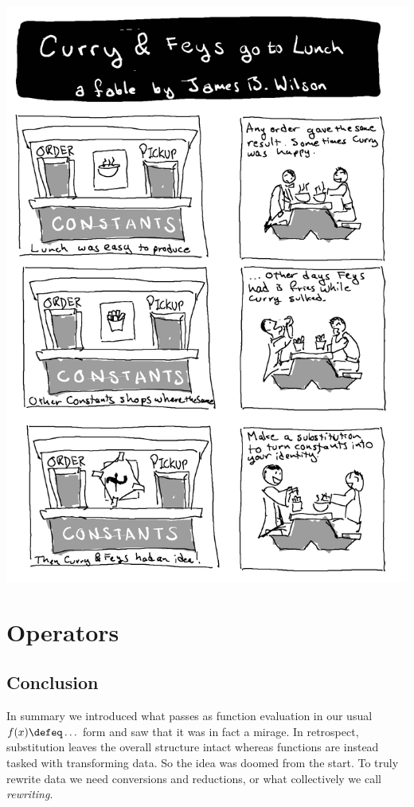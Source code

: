 
\cleardoublepage

\includegraphics[width=\textwidth]{curry-feys.png}

\chapter{Operators}





% 

\section*{Conclusion}
In summary we introduced what passes as function evaluation 
in our usual $f(x)\defeq \ldots$ form and saw that it was in fact 
a mirage.  In retrospect, substitution leaves the overall structure 
intact whereas functions are instead tasked with transforming data.
So the idea was doomed from the start.  To truly rewrite data we need 
conversions and reductions, or what collectively we call \emph{rewriting}.

